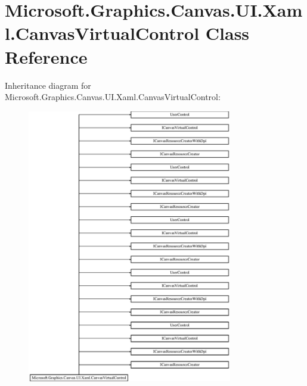 \hypertarget{class_microsoft_1_1_graphics_1_1_canvas_1_1_u_i_1_1_xaml_1_1_canvas_virtual_control}{}\section{Microsoft.\+Graphics.\+Canvas.\+U\+I.\+Xaml.\+Canvas\+Virtual\+Control Class Reference}
\label{class_microsoft_1_1_graphics_1_1_canvas_1_1_u_i_1_1_xaml_1_1_canvas_virtual_control}
Inheritance diagram for Microsoft.\+Graphics.\+Canvas.\+U\+I.\+Xaml.\+Canvas\+Virtual\+Control\+:\begin{figure}[H]
\begin{center}
\leavevmode
\includegraphics[height=12.000000cm]{class_microsoft_1_1_graphics_1_1_canvas_1_1_u_i_1_1_xaml_1_1_canvas_virtual_control}
\end{center}
\end{figure}
